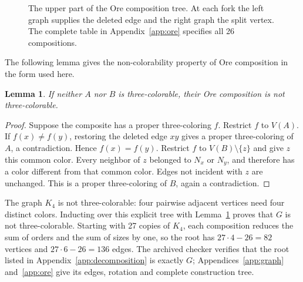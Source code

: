 \documentclass[11pt]{article}
\newtheorem{lemma}{Lemma}
\begin{document}
\begin{figure}[H]
\centering
{}
\caption{The upper part of the Ore composition tree. At each fork the
left graph supplies the deleted edge and the right graph the split vertex.
The complete table in Appendix~\ref{app:ore} specifies all 26 compositions.}
\label{fig:ore-tree}
\end{figure}
\endgroup

\begin{samepage}
The following lemma gives the non-colorability property of Ore
composition in the form used here.

\begin{lemma}\label{lem:ore}
If neither $A$ nor $B$ is three-colorable, their Ore composition is not
three-colorable.
\end{lemma}
\begin{proof}
Suppose the composite has a proper three-coloring $f$. Restrict $f$ to
$V(A)$. If $f(x)\ne f(y)$, restoring the deleted edge $xy$ gives a
proper three-coloring of $A$, a contradiction. Hence $f(x)=f(y)$.
Restrict $f$ to $V(B)\setminus\{z\}$ and give $z$ this common color.
Every neighbor of $z$ belonged to $N_x$ or $N_y$, and therefore has a
color different from that common color. Edges not incident with $z$
are unchanged. This is a proper three-coloring of $B$, again a
contradiction.
\end{proof}
\end{samepage}

The graph $K_4$ is not three-colorable: four pairwise adjacent vertices
need four distinct colors. Inducting over this explicit tree with
Lemma~\ref{lem:ore} proves that $G$ is not three-colorable. Starting with 27 copies of
$K_4$, each composition reduces the sum of orders and the sum of sizes by one,
so the root has $27\cdot4-26=82$ vertices and
$27\cdot6-26=136$ edges.
The archived checker verifies that the root listed in
Appendix~\ref{app:decomposition} is exactly $G$;
Appendices~\ref{app:graph} and~\ref{app:ore} give its edges, rotation
and complete construction tree.
\end{document}
